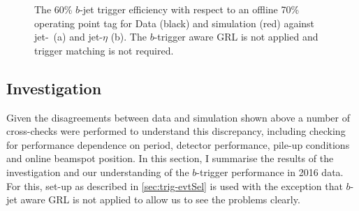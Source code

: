 \begin{figure}[!ht]
  \begin{center}
    \captionsetup[subfigure]{aboveskip=0pt,justification=centering}
  \end{center}
  \caption{The 60\% $b$-jet trigger efficiency with respect to an offline 70\% operating point tag
    for Data (black) and simulation (red) against jet-\pT~(a) and jet-$\eta$ (b).
    The $b$-trigger aware GRL is not applied and trigger matching is not required.}
  \label{fig:trig-Full_noGRL_eff_noHLTMatch}
\end{figure}

\subsection{Investigation}
\label{sec:trig-inv}

Given the disagreements between data and simulation shown above
a number of cross-checks were performed to understand this discrepancy,
including checking for performance dependence on period,
detector performance, pile-up conditions and online beamspot position.
In this section, I summarise the results of the investigation
and our understanding of the $b$-trigger performance in 2016 data.
For this, set-up as described in \ref{sec:trig-evtSel} is used
with the exception that $b$-jet aware GRL is not applied to allow us to see the problems clearly.

